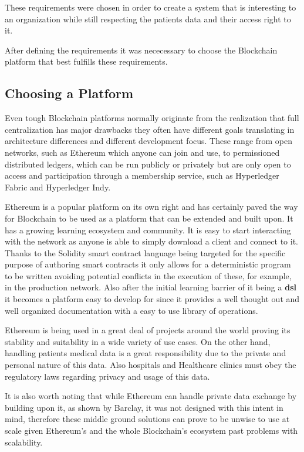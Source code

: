 These requirements were chosen in order to create a system that is interesting
to an organization while still respecting the patients data and their access
right to it. 

After defining the requirements it was nececessary to choose the Blockchain
platform that best fulfills these requirements.


\subsection{Choosing a Platform}\label{choosePlatform}

Even tough Blockchain platforms normally originate from the realization that
full centralization has major drawbacks they often have different goals
translating in architecture differences and different development focus.  These
range from open networks, such as Ethereum which anyone can join and use, to
permissioned distributed ledgers, which can be run publicly or privately but
are only open to access and participation through a membership service, such as
Hyperledger Fabric and Hyperledger Indy.

Ethereum is a popular platform on its own right and has certainly paved the way
for Blockchain to be used as a platform that can be extended and built upon. It
has a growing learning ecosystem and community. It is easy to start interacting
with the network as anyone is able to simply download a client and connect to
it.  Thanks to the Solidity smart contract language being targeted for the
specific purpose of authoring smart contracts it only allows for a
deterministic program to be written avoiding potential conflicts in the
execution of these, for example, in the production network. Also after the
initial learning barrier of it being a \textbf{dsl} it becomes a platform easy
to develop for since it provides a well thought out and well organized
documentation with a easy to use library of operations.

Ethereum is being used in a great deal of projects around the world proving its
stability and suitability in a wide variety of use cases. On the other hand,
handling patients medical data is a great responsibility due to the private and
personal nature of this data. Also hospitals and Healthcare clinics must obey
the regulatory laws regarding privacy and usage of this data.

It is also worth noting that while Ethereum can handle private data exchange by
building upon it, as shown by Barclay, it was not designed with this intent in
mind, therefore these middle ground solutions can prove to be unwise to use at
scale given Ethereum's and the whole Blockchain's ecosystem past problems with
scalability.  

